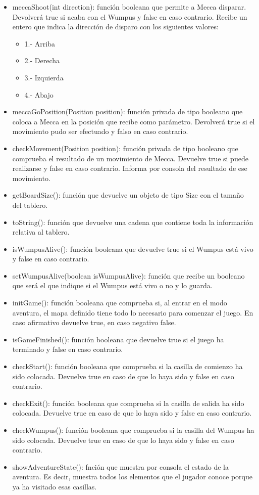 \documentclass[a4paper,12pt,twoside,openright]{report}
\begin{document}
\begin{itemize}
   \item meccaShoot(int direction): función booleana que permite a Mecca disparar. Devolverá true si acaba con el Wumpus
   y false en caso contrario. Recibe un entero que indica la dirección de disparo con los siguientes valores:
    \begin{itemize}
     \item 1.- Arriba
     \item 2.- Derecha
     \item 3.- Izquierda
     \item 4.- Abajo
    \end{itemize}
   \item meccaGoPosition(Position position): función privada de tipo booleano que coloca a Mecca en la posición que recibe 
   como parámetro. Devolverá true si el movimiento pudo ser efectuado y falso en caso contrario.
   \item checkMovement(Position position): función privada de tipo booleano que comprueba el resultado de un movimiento de Mecca.
   Devuelve true si puede realizarse y false en caso contrario. Informa por consola del resultado de ese movimiento.
   \item getBoardSize(): función que devuelve un objeto de tipo Size con el tamaño del tablero.
   \item toString(): función que devuelve una cadena que contiene toda la información relativa al tablero.
   \item isWumpusAlive(): función booleana que devuelve true si el Wumpus está vivo y false en caso contrario.
   \item setWumpusAlive(boolean isWumpusAlive): función que recibe un booleano que será el que indique si el Wumpus está vivo o no y lo guarda.
   \item initGame(): función booleana que comprueba si, al entrar en el modo aventura, el mapa definido tiene todo lo necesario 
   para comenzar el juego. En caso afirmativo devuelve true, en caso negativo false.
   \item isGameFinished(): función booleana que devuelve true si el juego ha terminado y false en caso contrario.
   \item checkStart(): función booleana que comprueba si la casilla de comienzo ha sido colocada. 
   Devuelve true en caso de que lo haya sido y false en caso contrario.
   \item checkExit(): función booleana que comprueba si la casilla de salida ha sido colocada. 
   Devuelve true en caso de que lo haya sido y false en caso contrario.
   \item checkWumpus(): función booleana que comprueba si la casilla del Wumpus ha sido colocada. 
   Devuelve true en caso de que lo haya sido y false en caso contrario.
   \item showAdventureState(): fnción que muestra por consola el estado de la aventura. Es decir, muestra todos los 
   elementos que el jugador conoce porque ya ha visitado esas casillas.
   \end{itemize}
   
\end{document}
